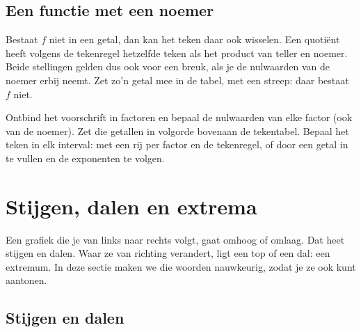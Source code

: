 \begin{oefeningen}
\end{oefeningen}

\subsection{Een functie met een noemer}

Bestaat $f$ niet in een getal, dan kan het teken daar ook wisselen. Een quotiënt heeft volgens de tekenregel hetzelfde teken als het product van teller en noemer. Beide stellingen gelden dus ook voor een breuk, als je de nulwaarden van de noemer erbij neemt. Zet zo'n getal mee in de tabel, met een streep: daar bestaat $f$ niet.


\begin{werkwijze}
Ontbind het voorschrift in factoren en bepaal de nulwaarden van elke factor (ook van de noemer). Zet die getallen in volgorde bovenaan de tekentabel. Bepaal het teken in elk interval: met een rij per factor en de tekenregel, of door een getal in te vullen en de exponenten te volgen.
\end{werkwijze}

\begin{oefeningen}
\end{oefeningen}

\section{Stijgen, dalen en extrema}

Een grafiek die je van links naar rechts volgt, gaat omhoog of omlaag. Dat heet stijgen en dalen. Waar ze van richting verandert, ligt een top of een dal: een extremum. In deze sectie maken we die woorden nauwkeurig, zodat je ze ook kunt aantonen.

\subsection{Stijgen en dalen}

